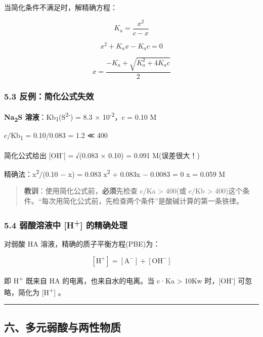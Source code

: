 当简化条件不满足时，解精确方程：

\[
K_a = \frac{x^2}{c - x}
\]

\[
x^2 + K_a x - K_a c = 0
\]

\[
x = \frac{-K_a + \sqrt{K_a^2 + 4K_a c}}{2}
\]

\subsubsection{5.3 反例：简化公式失效}\label{ux53cdux4f8bux7b80ux5316ux516cux5f0fux5931ux6548}

\textbf{Na\textsubscript{2}S 溶液}：Kb\textsubscript{1}(S\textsuperscript{2-}) = 8.3 × 10\textsuperscript{-2}，c = 0.10 M

c/Kb\textsubscript{1} = 0.10/0.083 = 1.2 ≪ 400

简化公式给出 {[}OH\textsuperscript{-}{]} = √(0.083 × 0.10) = 0.091 M(误差很大！)

精确法：x\textsuperscript{2}/(0.10 − x) = 0.083 \箭 x\textsuperscript{2} + 0.083x − 0.0083 = 0 \箭 x = 0.059 M

\begin{quote}
\textbf{教训}：使用简化公式前，\textbf{必须}先检查 c/Ka \textgreater{} 400(或 c/Kb \textgreater{} 400)这个条件。``每次用简化公式前，先检查两个条件''是酸碱计算的第一条铁律。
\end{quote}

\subsubsection{\texorpdfstring{5.4 弱酸溶液中 {[}H\textsuperscript{+}{]} 的精确处理}{5.4 弱酸溶液中 {[}H+{]} 的精确处理}}\label{ux5f31ux9178ux6eb6ux6db2ux4e2d-h-ux7684ux7cbeux786eux5904ux7406}

对弱酸 HA 溶液，精确的质子平衡方程(PBE)为：

\[
[\mathrm{H^+}] = [\mathrm{A^-}] + [\mathrm{OH^-}]
\]

即 H\textsuperscript{+} 既来自 HA 的电离，也来自水的电离。当 c·Ka \textgreater{} 10Kw 时，{[}OH\textsuperscript{-}{]} 可忽略，简化为 {[}H\textsuperscript{+}{]} 。

\begin{center}\rule{0.5\linewidth}{0.5pt}\end{center}

\subsection{六、多元弱酸与两性物质}\label{ux516dux591aux5143ux5f31ux9178ux4e0eux4e24ux6027ux7269ux8d28}

